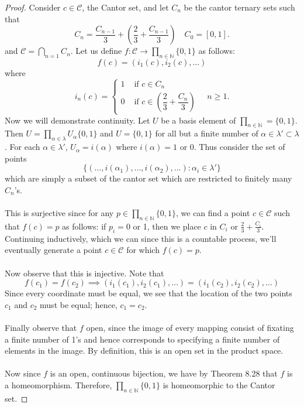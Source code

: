 \documentclass[letter,12pt,twoside]{hmcpset}
\begin{document}
\begin{proof}
    Consider $c \in \mathcal{C}$, the Cantor set, and let $C_n$ be the
    cantor ternary sets such that
    \[
      C_n = \frac{C_{n-1}}{3} + \left(\frac{2}{3} + \frac{C_{n-1}}{3}\right) \quad C_0 = [0, 1].  
    \]
    and $\mathcal{C} = \bigcap\limits_{n =
    1} C_n$. Let us define $f: 
    \mathcal{C} \to \prod_{n \in
    \mathbb{N}} \{0, 1\}$ as follows:
    \[
        f(c) = (i_1(c), i_2(c), \dots)
    \]
    where 
    \[
      i_n(c) = 
      \begin{cases}
          1 & \text{ if } c \in C_n\\
          0 & \text{ if } c \in \left(\dfrac{2}{3} + \dfrac{C_n}{3}\right) 
      \end{cases}
      \quad n \ge 1.
    \]
    Now we will demonstrate continuity. Let $U$ be a basis element of 
    $\prod_{n \in \mathbb{N}} = \{0, 1\}$. Then $U = \prod_{\alpha 
    \in \lambda}U_{\alpha} \{0, 1\}$ and $U = \{0, 1\}$ for all but a
    finite number of $\alpha \in \lambda' \subset \lambda$. For each
    $\alpha \in \lambda'$, $U_{\alpha} = i(\alpha)$ where $i(\alpha) =
    1$ or $0$. Thus consider the set of points
    \[
    \{
    (\dots, i(\alpha_1), \dots, i(\alpha_2), \dots) : \alpha_i \in \lambda'    
    \}
    \]
    which are simply a subset of the cantor set which are restricted
    to finitely many $C_n$'s.
    \\
    \\     
    This is surjective since for any $p \in \prod_{n \in
    \mathbb{N}} \{0, 1\}$, we can find a point $c \in \mathcal{C}$ such
    that $f(c) = p$ as follows: if $p_i = 0$ or 1, then we place
    $c$ in $C_i$ or $\frac{2}{3} + \frac{C_i}{3}$. Continuing
    inductively, which we can since this is a countable process, we'll
    eventually generate a point $c \in \mathcal{C}$ for which $f(c) =
    p$.
    \\
    \\
    Now observe that this is injective. Note that 
    \[
      f(c_1) = f(c_2) \implies (i_1(c_1), i_2(c_1), \dots) = (i_1(c_2), i_2(c_2), \dots)   
    \]
    Since every coordinate must be equal, we see that the location of
    the two points $c_1$ and $c_2$ must be equal; hence, $c_1 = c_2.$
    \\
    \\
    Finally observe that $f$ open, since the image of every mapping
    consist of fixating a finite number of 1's and hence corresponds
    to specifying a finite number of elements in the image. By
    definition, this is an open set in the product space.
    \\
    \\
    Now since $f$ is an open, continuous bijection, we have by Theorem
    8.28 that $f$ is a homeomorphism. Therefore, $\prod_{n \in
    \mathbb{N}}\{0, 1\}$ is homeomorphic to the Cantor set.
\end{proof}
\end{document}

